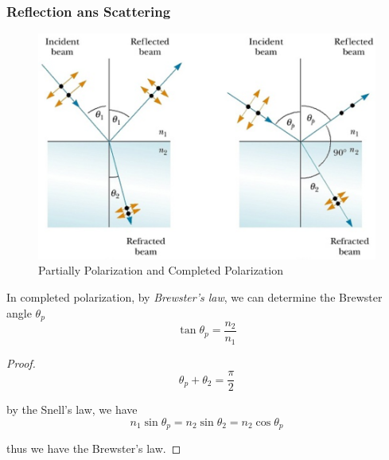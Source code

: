 \documentclass[openany]{book}
\begin{document}
\subsubsection{Reflection ans Scattering}
\begin{figure}[H]
\centering
\label{fig:15}
\includegraphics[scale=0.5]{Figure/15.PNG}
\caption{Partially Polarization and Completed Polarization}
\end{figure}
In completed polarization, by \emph{Brewster's law}, we can determine the Brewster angle $\theta _p$
\[\tan \theta _p=\frac{n_2}{n_1}\]

\begin{proof}
\[\theta _p+\theta _2=\frac{\pi }{2}\]

by the Snell's law, we have
\[n_1\sin \theta _p=n_2\sin \theta _2=n_2\cos \theta _p\]

thus we have the Brewster's law.
\end{proof}
\end{document}
